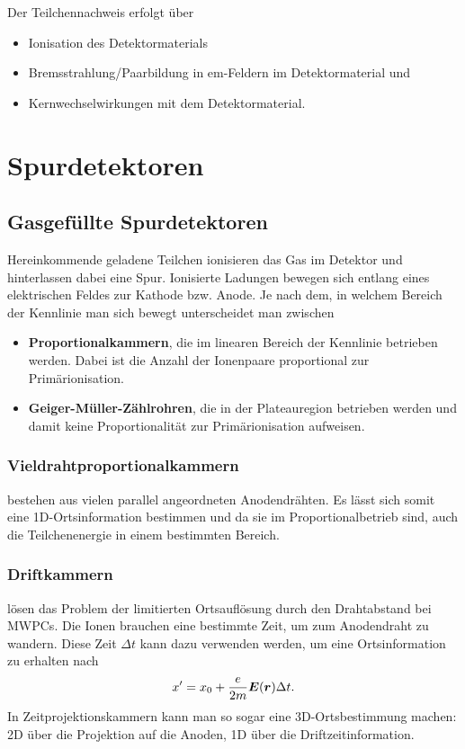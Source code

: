 Der Teilchennachweis erfolgt über
\begin{itemize}
	\item Ionisation des Detektormaterials
	\item Bremsstrahlung/Paarbildung in em-Feldern im Detektormaterial und
	\item Kernwechselwirkungen mit dem Detektormaterial.
\end{itemize}

\section{Spurdetektoren}
\subsection{Gasgefüllte Spurdetektoren}
Hereinkommende geladene Teilchen ionisieren das Gas im Detektor und hinterlassen dabei eine Spur.
Ionisierte Ladungen bewegen sich entlang eines elektrischen Feldes zur Kathode bzw. Anode.
Je nach dem, in welchem Bereich der Kennlinie man sich bewegt unterscheidet man zwischen
\begin{itemize}
	\item \textbf{Proportionalkammern}, die im linearen Bereich der Kennlinie betrieben werden. Dabei ist die Anzahl der Ionenpaare proportional zur Primärionisation.
	\item \textbf{Geiger-Müller-Zählrohren}, die in der Plateauregion betrieben werden und damit keine Proportionalität zur Primärionisation aufweisen.
\end{itemize}
\subsubsection{Vieldrahtproportionalkammern}
bestehen aus vielen parallel angeordneten Anodendrähten. Es lässt sich somit eine 1D-Ortsinformation bestimmen und da sie im Proportionalbetrieb sind, auch die Teilchenenergie in einem bestimmten Bereich.

\subsubsection{Driftkammern}
lösen das Problem der limitierten Ortsauflösung durch den Drahtabstand bei MWPCs. Die Ionen brauchen eine bestimmte Zeit, um zum Anodendraht zu wandern. Diese Zeit $\Delta t$ kann dazu verwenden werden, um eine Ortsinformation zu erhalten nach
\begin{equation*}
	x' = x_0 + \frac{e}{2m}\boldsymbol{E}(\boldsymbol{r})\Delta t.
\end{equation*}
In Zeitprojektionskammern kann man so sogar eine 3D-Ortsbestimmung machen: 2D über die Projektion auf die Anoden, 1D über die Driftzeitinformation.

